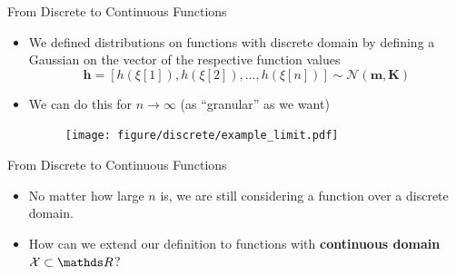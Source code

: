 \begin{vbframe}{From Discrete to Continuous Functions}

\begin{itemize}
  \item We defined distributions on functions with discrete domain by defining a Gaussian on the vector of the respective function values 
  $$
    \mathbf{h} = [h(\xi[1]), h(\xi[2]), \dots, h(\xi[n])] \sim \mathcal{N}(\bm{m}, \bm{K})
  $$

  \item We can do this for $n \to \infty$ (as \enquote{granular} as we want)
  \begin{figure}
    \texttt{[image: figure/discrete/example\_limit.pdf]}
  \end{figure}
\end{itemize}

\end{vbframe}

\begin{frame}{From Discrete to Continuous Functions}


\begin{itemize}
  \item No matter how large $n$ is, we are still considering a function over a discrete domain. 
  \item How can we extend our definition to functions with \textbf{continuous domain} $\Xspace \subset \R$?
\end{itemize}

\end{frame}


